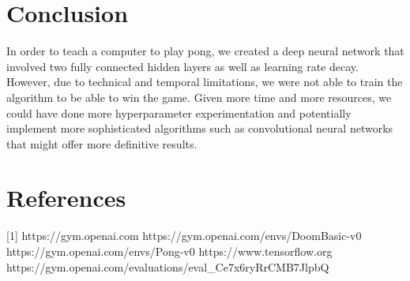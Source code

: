\documentclass[12pt]{article}
\theoremstyle{plain}
\theoremstyle{definition}
\theoremstyle{remark}
\theoremstyle{plain}
\begin{document}
\section{Conclusion}
In order to teach a computer to play pong, we created a deep neural network that involved two fully connected hidden layers as well as learning rate decay.  However, due to technical and temporal limitations, we were not able to train the algorithm to be able to win the game.  Given more time and more resources, we could have done more hyperparameter experimentation and potentially implement more sophisticated algorithms such as convolutional neural networks that might offer more definitive results.
\section{References}
[1] https://gym.openai.com \newline
[2] https://gym.openai.com/envs/DoomBasic-v0 \newline
[3] https://gym.openai.com/envs/Pong-v0 \newline
[4] https://www.tensorflow.org \newline
[5] https://gym.openai.com/evaluations/eval\_Ce7x6ryRrCMB7JlpbQ \newline
\end{document}
